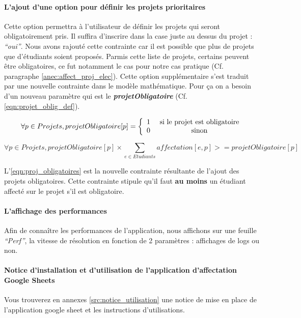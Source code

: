 \documentclass[final,poster]{polytech/polytech}
\begin{document}
\paragraph{L'ajout d'une option pour définir les projets prioritaires}
Cette option permettra à l'utilisateur de définir les projets qui seront obligatoirement pris. Il suffira d'inscrire dans la case juste au dessus du projet : \textit{“oui”}. 
Nous avons rajouté cette contrainte car il est possible que plus de projets que d'étudiants soient proposés. Parmis cette liste de projets, certains peuvent être obligatoires, ce fut notamment le cas pour notre cas pratique (Cf. paragraphe \autoref{anec:affect_proj_elec}).
Cette option supplémentaire s'est traduit par une nouvelle contrainte dans le modèle mathématique. Pour ça on a besoin d'un nouveau paramètre qui est le \textbf{\textit{projetObligatoire}} (Cf. \autoref{eqn:projet_oblig_def}).

\begin{equation}
\forall {p \in Projets}, projetObligatoire[p]=
\left\lbrace
\begin{array}{c c }
1 & \text{ si le projet est obligatoire} \\
0 & \text{ sinon}
\end{array}
\right.
\label{eqn:projet_oblig_def}
\end{equation}

\begin{equation}
\forall {p \in Projets}, projetObligatoire[p]\times\sum_{e \in Etudiants} affectation[e,p] >=projetObligatoire[p]
\label{eqn:proj_obligatoires}
\end{equation}


L'\autoref{eqn:proj_obligatoires} est la nouvelle contrainte résultante de l'ajout des projets obligatoires. Cette contrainte stipule qu'il faut \textbf{au moins} un étudiant affecté sur le projet s'il est obligatoire.

\paragraph{L'affichage des performances}
Afin de connaître les performances de l'application, nous affichons sur une feuille \textit{“Perf”}, la vitesse de résolution en fonction de 2 paramètres : affichages de logs ou non.


\paragraph{Notice d'installation et d'utilisation de l'application d'affectation Google Sheets}
Vous trouverez en annexes \autoref{src:notice_utilisation} une notice de mise en place de l'application google sheet et les instructions d'utilisations.
\end{document}
